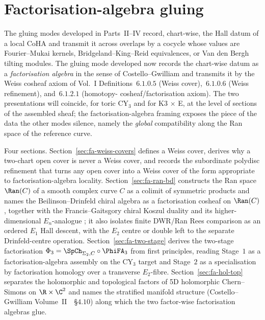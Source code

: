 \providecommand{\Lie}{\mathrm{Lie}}
\section{Factorisation-algebra gluing}
\label{sec:gluing:factorisation}
\label{part:gluing-factorisation}
The gluing modes developed in Parts~II--IV record, chart-wise, the Hall
datum of a local CoHA and transmit it across overlaps by a cocycle whose
values are Fourier--Mukai kernels, Bridgeland--King--Reid equivalences,
or Van den Bergh tilting modules. The gluing mode developed now records
the chart-wise datum as a \emph{factorisation algebra} in the sense of
Costello--Gwilliam \cite{CostelloGwilliam,CostelloGwilliam2017} and
transmits it by the Weiss cosheaf axiom of \cite{CostelloGwilliam}
Vol.~I Definitions~$6.1.0.5$ \textup{(}Weiss cover\textup{),}~$6.1.0.6$
\textup{(}Weiss refinement\textup{),} and~$6.1.2.1$ \textup{(}homotopy-
cosheaf/factorisation axiom\textup{).} The two presentations will
coincide, for toric CY$_3$ and for K3 $\times$ E, at the level of
sections of the assembled sheaf; the factorisation-algebra framing
exposes the piece of the data the other modes silence, namely the
\emph{global} compatibility along the Ran space of the reference curve.

Four sections. Section~\ref{sec:fa-weiss-covers} defines a Weiss cover,
derives why a two-chart open cover is never a Weiss cover, and records
the subordinate polydisc refinement that turns any open cover into a
Weiss cover of the form appropriate to factorisation-algebra locality.
Section~\ref{sec:fa-ran-bd} constructs the Ran space $\Ran(C)$ of a
smooth complex curve $C$ as a colimit of symmetric products and names
the Beilinson--Drinfeld chiral algebra as a factorisation cosheaf on
$\Ran(C)$, together with the Francis--Gaitsgory
\cite{FrancisGaitsgory2012} chiral Koszul duality and its
higher-dimensional $E_n$-analogue \cite{Francis2013}; it also isolates
finite DWR/Ran Rees comparison as an ordered $E_1$ Hall descent, with
the $E_2$ centre or double left to the separate Drinfeld-centre
operation.
Section~\ref{sec:fa-two-stage} derives the two-stage factorisation
$\Phi_3 = \SpCh_{\Sigma_2, C} \circ \PhiFA_3$ from first principles,
reading Stage~$1$ as a factorisation-algebra assembly on the CY$_3$
target and Stage~$2$ as a specialisation by factorisation homology
over a transverse $E_2$-fibre. Section~\ref{sec:fa-hol-top} separates
the holomorphic and topological factors of 5D holomorphic Chern--Simons
on $\R \times \C^2$ and names the stratified manifold structure
(Costello--Gwilliam Volume~II~\cite{CostelloGwilliam2017}~\S$4.10$) along
which the two factor-wise factorisation algebras glue.

